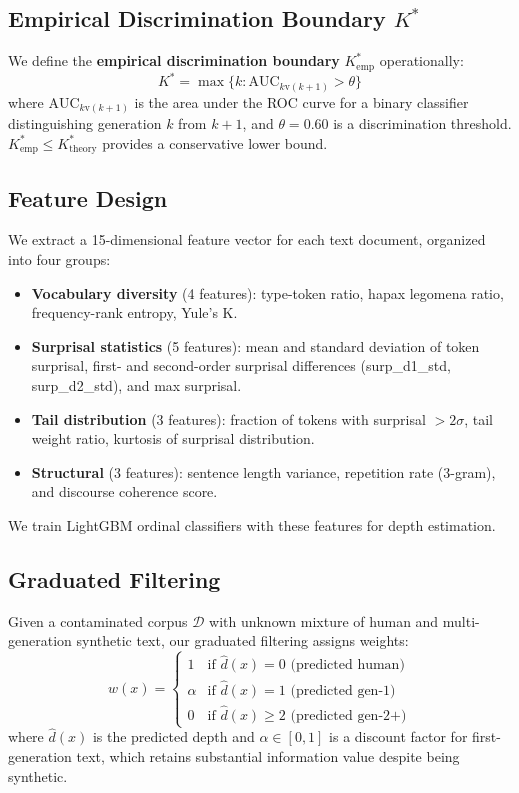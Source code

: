 \documentclass[11pt,a4paper]{article}
\begin{document}
\subsection{Empirical Discrimination Boundary $K^*$}

We define the \textbf{empirical discrimination boundary} $K^*_{\text{emp}}$ operationally:
\begin{equation}
K^* = \max\{k : \text{AUC}_{k \text{v} (k+1)} > \theta\}
\end{equation}
where $\text{AUC}_{k\text{v}(k+1)}$ is the area under the ROC curve for a binary classifier distinguishing generation $k$ from $k+1$, and $\theta = 0.60$ is a discrimination threshold.
$K^*_{\text{emp}} \leq K^*_{\text{theory}}$ provides a conservative lower bound.

\subsection{Feature Design}

We extract a 15-dimensional feature vector for each text document, organized into four groups:

\begin{itemize}
\item \textbf{Vocabulary diversity} (4 features): type-token ratio, hapax legomena ratio, frequency-rank entropy, Yule's K.
\item \textbf{Surprisal statistics} (5 features): mean and standard deviation of token surprisal, first- and second-order surprisal differences (surp\_d1\_std, surp\_d2\_std), and max surprisal.
\item \textbf{Tail distribution} (3 features): fraction of tokens with surprisal $> 2\sigma$, tail weight ratio, kurtosis of surprisal distribution.
\item \textbf{Structural} (3 features): sentence length variance, repetition rate (3-gram), and discourse coherence score.
\end{itemize}

We train LightGBM ordinal classifiers with these features for depth estimation.

\subsection{Graduated Filtering}

Given a contaminated corpus $\mathcal{D}$ with unknown mixture of human and multi-generation synthetic text, our graduated filtering assigns weights:
\begin{equation}
w(x) = \begin{cases}
1 & \text{if } \hat{d}(x) = 0 \text{ (predicted human)} \\
\alpha & \text{if } \hat{d}(x) = 1 \text{ (predicted gen-1)} \\
0 & \text{if } \hat{d}(x) \geq 2 \text{ (predicted gen-2+)}
\end{cases}
\end{equation}
where $\hat{d}(x)$ is the predicted depth and $\alpha \in [0, 1]$ is a discount factor for first-generation text, which retains substantial information value despite being synthetic.
\end{document}
